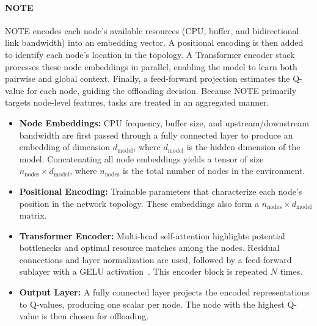 \documentclass[preprint,3p,authoryear]{elsarticle}
\begin{document}
\paragraph{NOTE}\label{par:note}

NOTE encodes each node’s available resources (CPU, buffer, and bidirectional link bandwidth) into an embedding vector. A positional encoding is then added to identify each node’s location in the topology. A Transformer encoder stack processes these node embeddings in parallel, enabling the model to learn both pairwise and global context. Finally, a feed-forward projection estimates the Q-value for each node, guiding the offloading decision. Because NOTE primarily targets node-level features, tasks are treated in an aggregated manner.

\begin{itemize}
    \item \textbf{Node Embeddings:} CPU frequency, buffer size, and upstream/downstream bandwidth are first passed through a fully connected layer to produce an embedding of dimension \(\displaystyle d_{\text{model}}\), where \(d_{\text{model}}\) is the hidden dimension of the model. Concatenating all node embeddings yields a tensor of size \(\displaystyle n_{\text{nodes}} \times d_{\text{model}}\), where \(n_{\text{nodes}}\) is the total number of nodes in the environment.
    \item \textbf{Positional Encoding:} Trainable parameters that characterize each node’s position in the network topology. These embeddings also form a \(\displaystyle n_{\text{nodes}} \times d_{\text{model}}\) matrix.
    \item \textbf{Transformer Encoder:} Multi-head self-attention highlights potential bottlenecks and optimal resource matches among the nodes. Residual connections and layer normalization are used, followed by a feed-forward sublayer with a GELU activation~\citep{hendrycks2023gaussianerrorlinearunits}. This encoder block is repeated \(N\) times.
    \item \textbf{Output Layer:} A fully connected layer projects the encoded representations to Q-values, producing one scalar per node. The node with the highest Q-value is then chosen for offloading.
\end{itemize}
\end{document}
